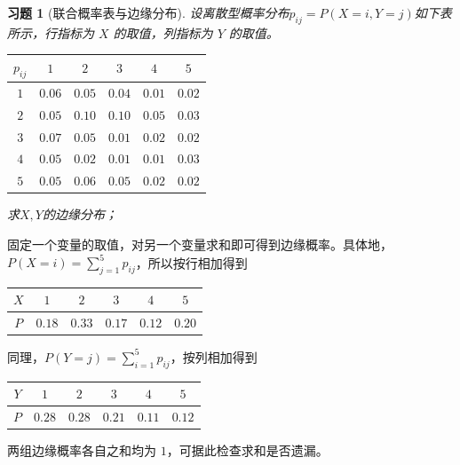 \documentclass[UTF8,12pt,a4paper,fontset=fandol]{ctexart}
\newtheorem{exercise}{习题}[section]
\begin{document}
\begin{exercise}[联合概率表与边缘分布]\label{q:Y4.3}
设离散型概率分布$p_{ij}=P(X=i,Y=j)$如下表所示，行指标为 $X$ 的取值，列指标为 $Y$ 的取值。

\begin{center}
    
    \begin{tabular}{|c|c|c|c|c|c|} \hline 
 $p_{ij}$&  $1$&$2$&$3$&$4$&$5$\\ \hline 
 $1$&  $0.06$&$0.05$    &$0.04$&$0.01$&$0.02$\\ \hline 
         $2$&    $0.05$&$0.10$&$0.10$&$0.05$&$0.03$\\ \hline 
         $3$& 
      $0.07$&$0.05$& $0.01$&$0.02$&$0.02$\\ \hline
 $4$& $0.05$& $0.02$& $0.01$&$0.01$&$0.03$\\\hline
 $5$& $0.05$& $0.06$& $0.05$& $0.02$&$0.02$\\\hline\end{tabular}
\end{center}

求$X,Y$的边缘分布；\par{}
\end{exercise}

\begin{solve}\label{a:Y4.3}固定一个变量的取值，对另一个变量求和即可得到边缘概率。具体地，$P(X=i)=\sum_{j=1}^5p_{ij}$，所以按行相加得到
\begin{center}
    
    \begin{tabular}{|c|c|c|c|c|c|} \hline 
         $X$&  $1$& $2$&$3$& $4$&$5$\\ \hline 
         $P$& 
     $0.18$& $0.33$& $0.17$& $0.12$&$0.20$\\ \hline\end{tabular}

\end{center}
同理，$P(Y=j)=\sum_{i=1}^5p_{ij}$，按列相加得到\begin{center}
    
    \begin{tabular}{|c|c|c|c|c|c|} \hline 
         $Y$&  $1$& $2$&$3$& $4$&$5$\\ \hline 
         $P$& 
     $0.28$& $0.28$& $0.21$& $0.11$&$0.12$\\ \hline\end{tabular}

\end{center}

两组边缘概率各自之和均为 $1$，可据此检查求和是否遗漏。\end{solve}
\end{document}
